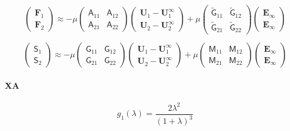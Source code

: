 \documentclass[12pt]{article}
\newcommand{\tens}[1]{\bm{\mathsf{#1}}}
\begin{document}
\begin{equation}
 \begin{pmatrix}
  \bm{F}_{1} \\
  \bm{F}_{2} 
 \end{pmatrix}
\approx
- \mu
\begin{pmatrix}
\tens{A}_{11} &
\tens{A}_{12}  \\
\tens{A}_{21}  &
\tens{A}_{22}  
\end{pmatrix}
 \begin{pmatrix}
  \bm{U}_{1} -  \bm{U}_{1}^{\infty}\\
  \bm{U}_{2} -  \bm{U}_{2}^{\infty}
 \end{pmatrix}
 + \mu
\begin{pmatrix}
\tilde{\tens{G}}_{11} &
\tilde{\tens{G}}_{12}  \\
\tilde{\tens{G}}_{21}  &
\tilde{\tens{G}}_{22}  
\end{pmatrix}
 \begin{pmatrix}
\bm{E}_{\infty} \\ \bm{E}_{\infty}
\end{pmatrix}
\end{equation}

\begin{equation}
 \begin{pmatrix}
  \tens{S}_{1} \\
  \tens{S}_{2} 
 \end{pmatrix}
\approx
- \mu
\begin{pmatrix}
\tens{G}_{11} &
\tens{G}_{12}  \\
\tens{G}_{21}  &
\tens{G}_{22}  
\end{pmatrix}
 \begin{pmatrix}
  \bm{U}_{1} -  \bm{U}_{1}^{\infty}\\
  \bm{U}_{2} -  \bm{U}_{2}^{\infty}
 \end{pmatrix}
 + \mu
\begin{pmatrix}
\tens{M}_{11} &
\tens{M}_{12}  \\
\tens{M}_{21}  &
\tens{M}_{22}  
\end{pmatrix}
 \begin{pmatrix}
\bm{E}_{\infty} \\ \bm{E}_{\infty}
\end{pmatrix}
\end{equation}


\paragraph{XA}
\begin{equation}
 g_1 (\lambda) = \frac{2\lambda^2}{(1+\lambda)^3}
\end{equation}
\end{document}
